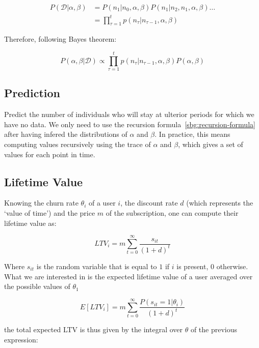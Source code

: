\documentclass{tufte-book}
\begin{document}
\begin{align*}
  P(\mathcal{D} | \alpha, \beta) &= P(n_1|n_0, \alpha, \beta) P(n_1|n_2, n_1, \alpha, \beta) \dots\\
      &= \prod_{\tau=1}^t p(n_\tau|n_{\tau-1}, \alpha, \beta)
\end{align*}

Therefore, following Bayes theorem:

\begin{equation}
  P(\alpha, \beta | \mathcal{D}) \propto \prod_{\tau=1}^t p(n_\tau|n_{\tau-1}, \alpha, \beta) P(\alpha, \beta)
\end{equation}

  \subsection{Prediction}%
  \label{sub:prediction}

Predict the number of individuals who will stay at ulterior periods for which we have no data. We only need to
use the recursion formula~\ref{sbg:recursion-formula} after having infered the distributions of $\alpha$ and
$\beta$. In practice, this means computing values recursively using the trace of $\alpha$ and $\beta$, which
gives a set of values for each point in time.

  
  \subsection{Lifetime Value}%
  \label{sub:lifetime_value}
  
Knowing the churn rate $\theta_i$ of a user $i$, the discount rate $d$ (which represents the `value of
time') and the price $m$ of the subscription, one can compute their lifetime value as:

\begin{equation}
  LTV_i = m \sum_{t=0}^\infty \frac{s_{it}}{\left(1+d\right)^t}
\end{equation}

Where $s_{it}$ is the random variable that is equal to $1$ if $i$ is present, $0$ otherwise. What we are interested in is the expected lifetime value of a user averaged over the possible values of
$\theta_1$

\begin{equation}
  E\left[LTV_i\right] = m \sum_{t=0}^\infty \frac{P(s_{it}=1|\theta_i)}{(1+d)^t}
\end{equation}

the total expected LTV is thus given by the integral over $\theta$ of the previous expression:
\end{document}
